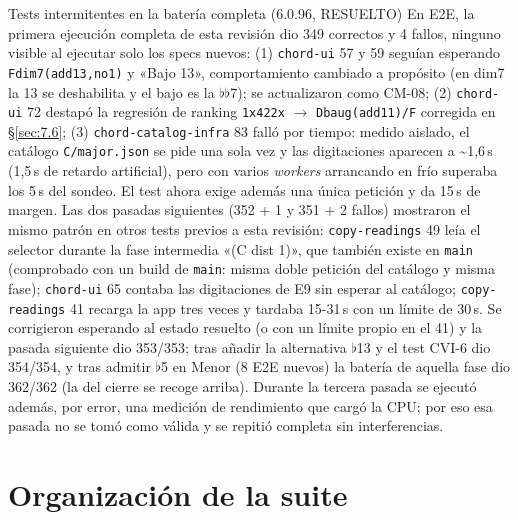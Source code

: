 \documentclass[a4paper,11pt,oneside]{report}
\newcommand{\Sref}[1]{\S\ref{#1}}
\newcommand{\flt}{\ensuremath{\flat}}
\begin{document}
\begin{hallazgobox}{Tests intermitentes en la batería completa (6.0.96, RESUELTO)}
\smallskip
En E2E, la primera ejecución completa de esta revisión dio 349 correctos y 4 fallos, ninguno visible al ejecutar solo los specs nuevos: (1) \lstinline!chord-ui! 57 y 59 seguían esperando \lstinline!Fdim7(add13,no1)! y «Bajo 13», comportamiento cambiado a propósito (en dim7 la 13 se deshabilita y el bajo es la \flt\flt7); se actualizaron como CM-08; (2) \lstinline!chord-ui! 72 destapó la regresión de ranking \lstinline!1x422x! $\to$ \lstinline!Dbaug(add11)/F! corregida en \Sref{sec:7.6}; (3) \lstinline!chord-catalog-infra! 83 falló por tiempo: medido aislado, el catálogo \lstinline!C/major.json! se pide una sola vez y las digitaciones aparecen a \textasciitilde1,6\,s (1,5\,s de retardo artificial), pero con varios \textit{workers} arrancando en frío superaba los 5\,s del sondeo. El test ahora exige además una única petición y da 15\,s de margen. Las dos pasadas siguientes (352 + 1 y 351 + 2 fallos) mostraron el mismo patrón en otros tests previos a esta revisión: \lstinline!copy-readings! 49 leía el selector durante la fase intermedia «(C dist 1)», que también existe en \lstinline!main! (comprobado con un build de \lstinline!main!: misma doble petición del catálogo y misma fase); \lstinline!chord-ui! 65 contaba las digitaciones de E9 sin esperar al catálogo; \lstinline!copy-readings! 41 recarga la app tres veces y tardaba 15-31\,s con un límite de 30\,s. Se corrigieron esperando al estado resuelto (o con un límite propio en el 41) y la pasada siguiente dio 353/353; tras añadir la alternativa \flt13 y el test CVI-6 dio 354/354, y tras admitir \flt5 en Menor (8 E2E nuevos) la batería de aquella fase dio 362/362 (la del cierre se recoge arriba). Durante la tercera pasada se ejecutó además, por error, una medición de rendimiento que cargó la CPU; por eso esa pasada no se tomó como válida y se repitió completa sin interferencias.
\end{hallazgobox}

\section{Organización de la suite}
\label{sec:15.3}
\end{document}
